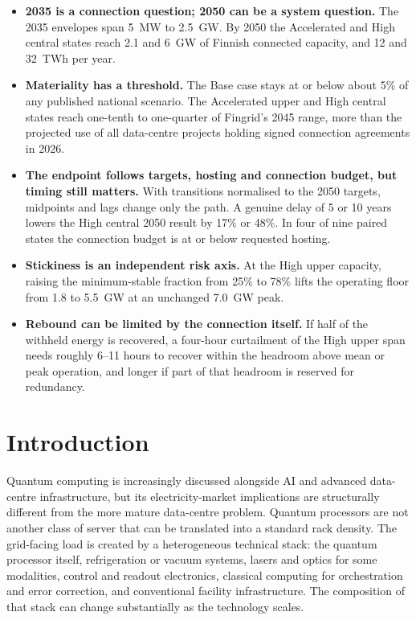 \documentclass[11pt,a4paper]{article}
\begin{document}
\begin{tcolorbox}[enhanced,colback=panel,colframe=panel,arc=2pt,boxrule=0pt,left=8pt,right=8pt,top=6pt,bottom=6pt,
  title={\textbf{Key findings}},coltitle=black,fonttitle=\small,attach title to upper={\par\vspace{2pt}}]
\small
\begin{itemize}[leftmargin=12pt]
  \item \textbf{2035 is a connection question; 2050 can be a system question.} The 2035 envelopes span 5~MW to 2.5~GW. By 2050 the Accelerated and High central states reach 2.1 and 6~GW of Finnish connected capacity, and 12 and 32~TWh per year.
  \item \textbf{Materiality has a threshold.} The Base case stays at or below about 5\% of any published national scenario. The Accelerated upper and High central states reach one-tenth to one-quarter of Fingrid's 2045 range, more than the projected use of all data-centre projects holding signed connection agreements in 2026.
  \item \textbf{The endpoint follows targets, hosting and connection budget, but timing still matters.} With transitions normalised to the 2050 targets, midpoints and lags change only the path. A genuine delay of 5 or 10 years lowers the High central 2050 result by 17\% or 48\%. In four of nine paired states the connection budget is at or below requested hosting.
  \item \textbf{Stickiness is an independent risk axis.} At the High upper capacity, raising the minimum-stable fraction from 25\% to 78\% lifts the operating floor from 1.8 to 5.5~GW at an unchanged 7.0~GW peak.
  \item \textbf{Rebound can be limited by the connection itself.} If half of the withheld energy is recovered, a four-hour curtailment of the High upper span needs roughly 6--11 hours to recover within the headroom above mean or peak operation, and longer if part of that headroom is reserved for redundancy.
\end{itemize}
\end{tcolorbox}

\section{Introduction}
Quantum computing is increasingly discussed alongside AI and advanced data-centre infrastructure, but its electricity-market implications are structurally different from the more mature data-centre problem. Quantum processors are not another class of server that can be translated into a standard rack density. The grid-facing load is created by a heterogeneous technical stack: the quantum processor itself, refrigeration or vacuum systems, lasers and optics for some modalities, control and readout electronics, classical computing for orchestration and error correction, and conventional facility infrastructure. The composition of that stack can change substantially as the technology scales.
\end{document}
